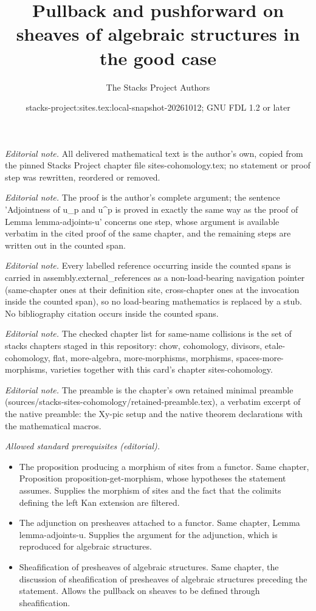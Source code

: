 \documentclass[10pt,a4paper]{amsart}
\title{Pullback and pushforward on sheaves of algebraic structures in the good case}
\author{The Stacks Project Authors}
\date{stacks-project:sites.tex:local-snapshot-20261012; GNU FDL 1.2 or later}
\theoremstyle{plain}
\theoremstyle{definition}
\theoremstyle{remark}
\numberwithin{equation}{subsection}
\begin{document}
\maketitle
\noindent\textit{Editorial note.} All delivered mathematical text is the author's own, copied from the pinned Stacks Project chapter file sites-cohomology.tex; no statement or proof step was rewritten, reordered or removed.\par\medskip
\noindent\textit{Editorial note.} The proof is the author's complete argument; the sentence 'Adjointness of u\_p and u\textasciicircum{}p is proved in exactly the same way as the proof of Lemma lemma-adjoints-u' concerns one step, whose argument is available verbatim in the cited proof of the same chapter, and the remaining steps are written out in the counted span.\par\medskip
\noindent\textit{Editorial note.} Every labelled reference occurring inside the counted spans is carried in assembly.external\_references as a non-load-bearing navigation pointer (same-chapter ones at their definition site, cross-chapter ones at the invocation inside the counted span), so no load-bearing mathematics is replaced by a stub. No bibliography citation occurs inside the counted spans.\par\medskip
\noindent\textit{Editorial note.} The checked chapter list for same-name collisions is the set of stacks chapters staged in this repository: chow, cohomology, divisors, etale-cohomology, flat, more-algebra, more-morphisms, morphisms, spaces-more-morphisms, varieties together with this card's chapter sites-cohomology.\par\medskip
\noindent\textit{Editorial note.} The preamble is the chapter's own retained minimal preamble (sources/stacks-sites-cohomology/retained-preamble.tex), a verbatim excerpt of the native preamble: the Xy-pic setup and the native theorem declarations with the mathematical macros.\par\medskip
\noindent\textit{Allowed standard prerequisites (editorial).}\begin{itemize}
\item The proposition producing a morphism of sites from a functor. Same chapter, Proposition proposition-get-morphism, whose hypotheses the statement assumes. Supplies the morphism of sites and the fact that the colimits defining the left Kan extension are filtered.
\item The adjunction on presheaves attached to a functor. Same chapter, Lemma lemma-adjoints-u. Supplies the argument for the adjunction, which is reproduced for algebraic structures.
\item Sheafification of presheaves of algebraic structures. Same chapter, the discussion of sheafification of presheaves of algebraic structures preceding the statement. Allows the pullback on sheaves to be defined through sheafification.
\end{itemize}\medskip
\end{document}
